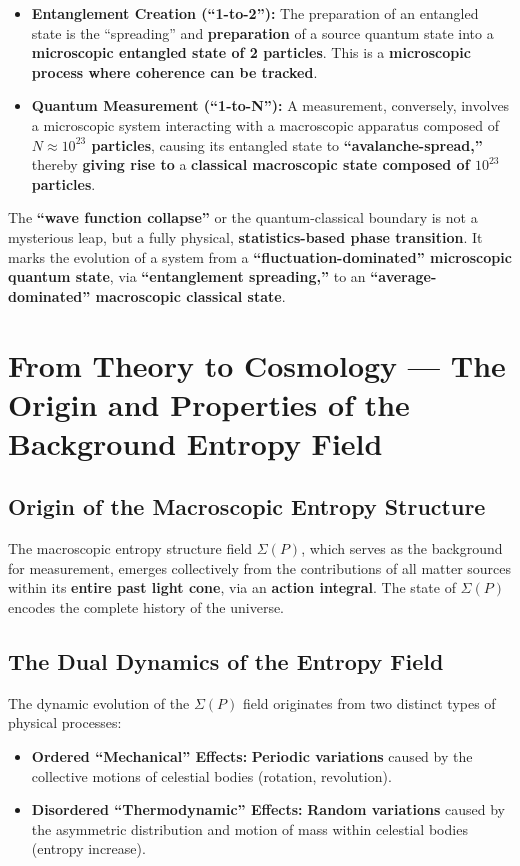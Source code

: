 \documentclass[11pt]{article}
\begin{document}
\begin{itemize}
    \item   \textbf{Entanglement Creation (``1-to-2''):} The preparation of an entangled state is the ``spreading'' and \textbf{preparation} of a source quantum state into a \textbf{microscopic entangled state of 2 particles}. This is a \textbf{microscopic process where coherence can be tracked}.
    \item   \textbf{Quantum Measurement (``1-to-N''):} A measurement, conversely, involves a microscopic system interacting with a macroscopic apparatus composed of \textbf{$N \approx 10^{23}$ particles}, causing its entangled state to \textbf{``avalanche-spread,''} thereby \textbf{giving rise to} a \textbf{classical macroscopic state composed of $10^{23}$ particles}.
\end{itemize}

\noindent The \textbf{``wave function collapse''} or the quantum-classical boundary is not a mysterious leap, but a fully physical, \textbf{statistics-based phase transition}. It marks the evolution of a system from a \textbf{``fluctuation-dominated'' microscopic quantum state}, via \textbf{``entanglement spreading,''} to an \textbf{``average-dominated'' macroscopic classical state}.



\section{From Theory to Cosmology — The Origin and Properties of the Background Entropy Field}

\subsection{Origin of the Macroscopic Entropy Structure}
The macroscopic entropy structure field $\Sigma(P)$, which serves as the background for measurement, emerges collectively from the contributions of all matter sources within its \textbf{entire past light cone}, via an \textbf{action integral}. The state of $\Sigma(P)$ encodes the complete history of the universe.

\subsection{The Dual Dynamics of the Entropy Field}
The dynamic evolution of the $\Sigma(P)$ field originates from two distinct types of physical processes:
\begin{itemize}
    \item   \textbf{Ordered ``Mechanical'' Effects:} \textbf{Periodic variations} caused by the collective motions of celestial bodies (rotation, revolution).
    \item   \textbf{Disordered ``Thermodynamic'' Effects:} \textbf{Random variations} caused by the asymmetric distribution and motion of mass within celestial bodies (entropy increase).
\end{itemize}
\end{document}
